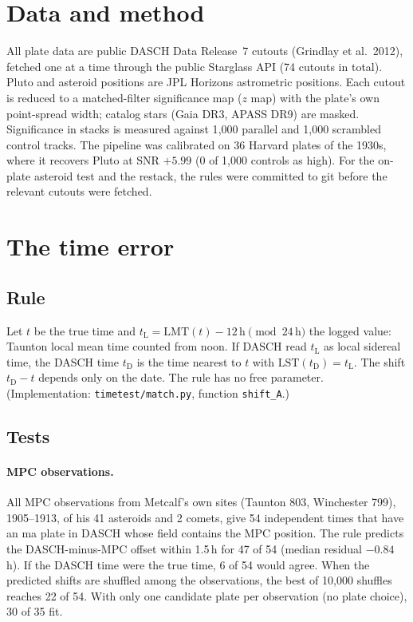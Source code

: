 \documentclass[11pt]{article}
\begin{document}
\section{Data and method}
All plate data are public DASCH Data Release~7 cutouts (Grindlay et al.~2012), fetched one at a time through the public Starglass API (74 cutouts in total). Pluto and asteroid positions are JPL Horizons astrometric positions. Each cutout is reduced to a matched-filter significance map ($z$ map) with the plate's own point-spread width; catalog stars (Gaia DR3, APASS DR9) are masked. Significance in stacks is measured against 1{,}000 parallel and 1{,}000 scrambled control tracks. The pipeline was calibrated on 36 Harvard plates of the 1930s, where it recovers Pluto at SNR $+5.99$ (0 of 1{,}000 controls as high). For the on-plate asteroid test and the restack, the rules were committed to git before the relevant cutouts were fetched.

\section{The time error}\label{sec:time}
\subsection{Rule}
Let $t$ be the true time and $t_\mathrm{L}=\mathrm{LMT}(t)-12\,\mathrm{h} \pmod{24\,\mathrm{h}}$ the logged value: Taunton local mean time counted from noon. If DASCH read $t_\mathrm{L}$ as local sidereal time, the DASCH time $t_\mathrm{D}$ is the time nearest to $t$ with $\mathrm{LST}(t_\mathrm{D}) = t_\mathrm{L}$. The shift $t_\mathrm{D}-t$ depends only on the date. The rule has no free parameter. (Implementation: \texttt{timetest/match.py}, function \texttt{shift\_A}.)

\subsection{Tests}
\paragraph{MPC observations.} All MPC observations from Metcalf's own sites (Taunton 803, Winchester 799), 1905--1913, of his 41 asteroids and 2 comets, give 54 independent times that have an ma plate in DASCH whose field contains the MPC position. The rule predicts the DASCH-minus-MPC offset within 1.5\,h for 47 of 54 (median residual $-0.84$\,h). If the DASCH time were the true time, 6 of 54 would agree. When the predicted shifts are shuffled among the observations, the best of 10{,}000 shuffles reaches 22 of 54. With only one candidate plate per observation (no plate choice), 30 of 35 fit.
\end{document}
